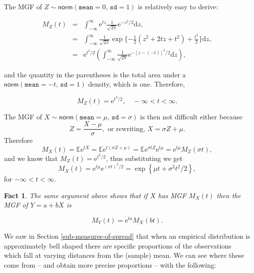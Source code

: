 \documentclass[]{book}
\numberwithin{equation}{chapter}
\numberwithin{figure}{chapter}
\theoremstyle{plain}
\newtheorem{fact}[thm]{Fact}
\theoremstyle{definition}
\theoremstyle{remark}
\theoremstyle{definition}
\theoremstyle{definition}
\theoremstyle{remark}
\let\BeginKnitrBlock\begin \let\EndKnitrBlock\end
\begin{document}
The MGF of \(Z\sim\mathsf{norm}(\mathtt{mean}=0,\,\mathtt{sd}=1)\) is
relatively easy to derive:

\begin{eqnarray*}
M_{Z}(t) & = & \int_{-\infty}^{\infty}\mathrm{e}^{tz}\frac{1}{\sqrt{2\pi}}\mathrm{e}^{-z^{2}/2}\mathrm{d} z,\\
 & = & \int_{-\infty}^{\infty}\frac{1}{\sqrt{2\pi}}\exp \{ -\frac{1}{2}\left(z^{2}+2tz+t^{2}\right)+\frac{t^{2}}{2} \} \mathrm{d} z,\\
 & = & \mathrm{e}^{t^{2}/2}\left(\int_{-\infty}^{\infty}\frac{1}{\sqrt{2\pi}}\mathrm{e}^{-[z-(-t)]^{2}/2}\mathrm{d} z\right),
\end{eqnarray*}

and the quantity in the parentheses is the total area under a
\(\mathsf{norm}(\mathtt{mean}=-t,\,\mathtt{sd}=1)\) density, which is
one. Therefore,

\begin{equation}
M_{Z}(t)=\mathrm{e}^{t^{2}/2},\quad -\infty < t < \infty.
\end{equation}

\bigskip

\BeginKnitrBlock{example}
\protect\hypertarget{ex:unnamed-chunk-266}{}{\label{ex:unnamed-chunk-266}}The
MGF of \(X\sim\mathsf{norm}(\mathtt{mean}=\mu,\,\mathtt{sd}=\sigma)\) is
then not difficult either because \[ Z=\frac{X-\mu}{\sigma},\mbox{ or
rewriting, }X=\sigma Z+\mu.  \] Therefore \[
M_{X}(t)=\mathbb{E}\mathrm{e}^{tX}=\mathbb{E}\mathrm{e}^{t(\sigma
Z+\mu)}=\mathbb{E}\mathrm{e}^{\sigma
tZ}\mathrm{e}^{t\mu}=\mathrm{e}^{t\mu}M_{Z}(\sigma t), \] and we know
that \(M_{Z}(t)=\mathrm{e}^{t^{2}/2}\), thus substituting we get \[
M_{X}(t)=\mathrm{e}^{t\mu}\mathrm{e}^{(\sigma t)^{2}/2}=\exp\left\{
\mu t+\sigma^{2}t^{2}/2\right\} , \] for \(-\infty<t<\infty\).
\EndKnitrBlock{example}

\bigskip

\begin{fact}
The same argument above shows that if \(X\) has MGF \(M_{X}(t)\) then
the MGF of \(Y=a+bX\) is

\begin{equation}
M_{Y}(t)=\mathrm{e}^{ta}M_{X}(bt).
\end{equation}
\end{fact}

\bigskip

\BeginKnitrBlock{example}[The 68-95-99.7 Rule]
\protect\hypertarget{ex:unnamed-chunk-268}{}{\label{ex:unnamed-chunk-268}
\iffalse (The 68-95-99.7 Rule) \fi }We saw in Section
\ref{sub-measures-of-spread} that when an empirical distribution is
approximately bell shaped there are specific proportions of the
observations which fall at varying distances from the (sample) mean. We
can see where these come from -- and obtain more precise proportions --
with the following:
\EndKnitrBlock{example}
\end{document}
